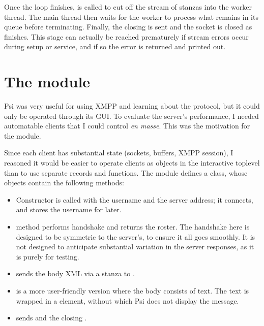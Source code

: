 \documentclass[12pt,a4paper,twoside,openright]{report}
\begin{document}
{Once the loop finishes,  is called to cut off the stream of stanzas into the worker thread. The main thread then waits for the worker to process what remains in its queue before terminating. Finally, the closing  is sent and the socket is closed as  finishes. This stage can actually be reached prematurely if stream errors occur during setup or service, and if so the error is returned and printed out.

\section{The  module}\label{sec:mod-client}
Psi was very useful for using XMPP and learning about the protocol, but it could only be operated through its GUI. To evaluate the server's performance, I needed automatable clients that I could control \emph{en masse}. This was the motivation for the  module.

Since each client has substantial state (sockets, buffers, XMPP session), I reasoned it would be easier to operate clients as objects in the interactive toplevel than to use separate records and functions. The module defines a  class, whose objects contain the following methods:

\begin{itemize}
  \item Constructor  is called with the username and the server address; it connects, and stores the username for later.

  \item {} method performs handshake and returns the roster. The handshake here is designed to be symmetric to the server's, to ensure it all goes smoothly. It is not designed to anticipate substantial variation in the server responses, as it is purely for testing.

  \item {} sends the body XML via a  stanza to .

  \item {} is a more user-friendly version where the body consists of text. The text is wrapped in a  element, without which Psi does not display the message.

  \item {} sends  and the closing .


\end{itemize}}
\end{document}
